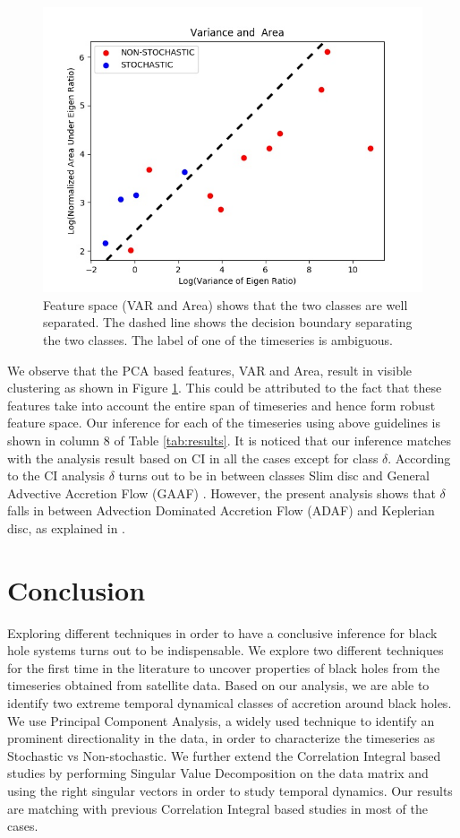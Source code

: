\documentclass[10pt,conference]{IEEEtran}
\begin{document}
\begin{figure}
    \centering
    \includegraphics[width=.9\linewidth]{var_area_fs.drawio.png}
    \caption{Feature space (VAR and Area) shows that the two classes are well separated. The dashed line shows the decision boundary separating the two classes. The label of one of the timeseries is ambiguous.}
    \label{fig:variance_area_fs}
\end{figure}

We observe that the PCA based features, VAR and Area, result in visible clustering as shown in Figure \ref{fig:variance_area_fs}. This could be attributed to the fact that   these features take into account the entire span of timeseries and hence form robust feature space. Our inference for each of the timeseries using above guidelines is shown in column 8 of Table \ref{tab:results}. It is noticed that our inference matches with the analysis result based on CI in all the cases except for class $\delta$. According to the CI analysis $\delta$ turns out to be in between classes Slim disc and General Advective Accretion Flow (GAAF) \cite{Adegoke2018}. However, the present analysis shows that $\delta$ falls in between Advection Dominated Accretion Flow (ADAF) and Keplerian disc, as explained in \cite{Adegoke2018}.


\section{Conclusion}
Exploring different techniques in order to have a conclusive inference for black hole systems turns out to be indispensable. We explore two different techniques for the first time in the literature to uncover  properties of black holes from the timeseries obtained from satellite data. Based on our analysis, we are able to identify two extreme temporal dynamical classes of accretion around black holes. We use Principal Component Analysis, a widely used technique to identify an prominent directionality in the data, in order to characterize the timeseries as Stochastic vs Non-stochastic. We further extend the Correlation Integral based studies by performing Singular Value Decomposition on the data matrix and using the right singular vectors in order to study temporal dynamics. Our results  are matching with previous Correlation Integral based studies in most of the cases.
\end{document}
